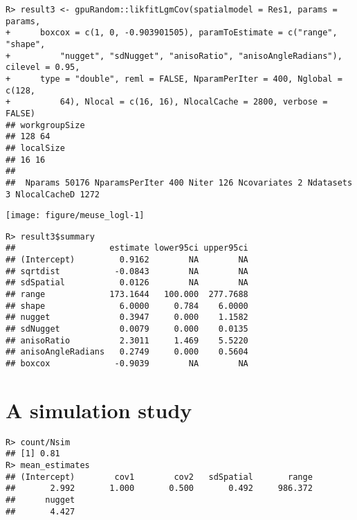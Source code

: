 \documentclass{article}\usepackage[]{graphicx}\usepackage[]{color}
\makeatletter
\def\maxwidth{ %
  \ifdim\Gin@nat@width>\linewidth
    \linewidth
  \else
    \Gin@nat@width
  \fi
}
\newenvironment{kframe}{%
 \def\at@end@of@kframe{}%
 \ifinner\ifhmode%
  \def\at@end@of@kframe{\end{minipage}}%
  \begin{minipage}{\columnwidth}%
 \fi\fi%
 \def\FrameCommand##1{\hskip\@totalleftmargin \hskip-\fboxsep
 \colorbox{shadecolor}{##1}\hskip-\fboxsep
     \hskip-\linewidth \hskip-\@totalleftmargin \hskip\columnwidth}%
 \MakeFramed {\advance\hsize-\width
   \@totalleftmargin\z@ \linewidth\hsize
   \@setminipage}}%
 {\par\unskip\endMakeFramed%
 \at@end@of@kframe}
\newenvironment{knitrout}{}{} %
\makeatother
\begin{document}
\begin{knitrout}
\color{fgcolor}\begin{kframe}
\begin{verbatim}
R> result3 <- gpuRandom::likfitLgmCov(spatialmodel = Res1, params = params,
+      boxcox = c(1, 0, -0.903901505), paramToEstimate = c("range", "shape",
+          "nugget", "sdNugget", "anisoRatio", "anisoAngleRadians"), cilevel = 0.95,
+      type = "double", reml = FALSE, NparamPerIter = 400, Nglobal = c(128,
+          64), Nlocal = c(16, 16), NlocalCache = 2800, verbose = FALSE)
## workgroupSize
## 128 64
## localSize
## 16 16
## 
##  Nparams 50176 NparamsPerIter 400 Niter 126 Ncovariates 2 Ndatasets 3 NlocalCacheD 1272
\end{verbatim}
\end{kframe}

{\centering \texttt{[image: figure/meuse\_logl-1]} 

}


\begin{kframe}\begin{verbatim}
R> result3$summary
##                   estimate lower95ci upper95ci
## (Intercept)         0.9162        NA        NA
## sqrtdist           -0.0843        NA        NA
## sdSpatial           0.0126        NA        NA
## range             173.1644   100.000  277.7688
## shape               6.0000     0.784    6.0000
## nugget              0.3947     0.000    1.1582
## sdNugget            0.0079     0.000    0.0135
## anisoRatio          2.3011     1.469    5.5220
## anisoAngleRadians   0.2749     0.000    0.5604
## boxcox             -0.9039        NA        NA
\end{verbatim}
\end{kframe}
\end{knitrout}



\section{A simulation study}









\begin{knitrout}
\color{fgcolor}\begin{kframe}
\begin{verbatim}
R> count/Nsim
## [1] 0.81
R> mean_estimates
## (Intercept)        cov1        cov2   sdSpatial       range 
##       2.992       1.000       0.500       0.492     986.372 
##      nugget 
##       4.427
\end{verbatim}
\end{kframe}
\end{knitrout}
\end{document}
